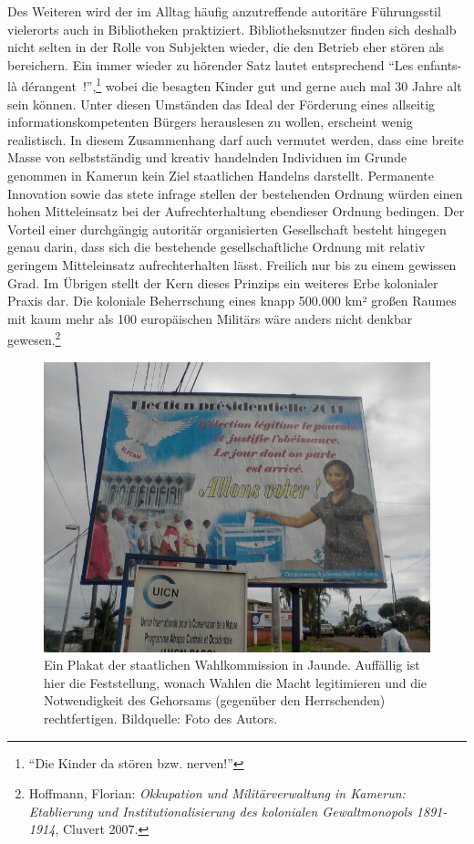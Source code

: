 \documentclass[a4paper,
fontsize=11pt,
oneside,
numbers=noperiodatend,
parskip=half-,
bibliography=totoc,
final
]{scrartcl}
\begin{document}
Des Weiteren wird der im Alltag häufig anzutreffende autoritäre
Führungsstil vielerorts auch in Bibliotheken praktiziert.
Bibliotheksnutzer finden sich deshalb nicht selten in der Rolle von
Subjekten wieder, die den Betrieb eher stören als bereichern. Ein immer
wieder zu hörender Satz lautet entsprechend \enquote{Les enfants-là
dérangent~!},\footnote{\enquote{Die Kinder da stören bzw. nerven!}}
wobei die besagten Kinder gut und gerne auch mal 30 Jahre alt sein
können. Unter diesen Umständen das Ideal der Förderung eines allseitig
informationskompetenten Bürgers herauslesen zu wollen, erscheint wenig
realistisch. In diesem Zusammenhang darf auch vermutet werden, dass eine
breite Masse von selbstständig und kreativ handelnden Individuen im
Grunde genommen in Kamerun kein Ziel staatlichen Handelns darstellt.
Permanente Innovation sowie das stete infrage stellen der bestehenden
Ordnung würden einen hohen Mitteleinsatz bei der Aufrechterhaltung
ebendieser Ordnung bedingen. Der Vorteil einer durchgängig autoritär
organisierten Gesellschaft besteht hingegen genau darin, dass sich die
bestehende gesellschaftliche Ordnung mit relativ geringem Mitteleinsatz
aufrechterhalten lässt. Freilich nur bis zu einem gewissen Grad. Im
Übrigen stellt der Kern dieses Prinzips ein weiteres Erbe kolonialer
Praxis dar. Die koloniale Beherrschung eines knapp 500.000 km² großen
Raumes mit kaum mehr als 100 europäischen Militärs wäre anders nicht
denkbar gewesen.\footnote{Hoffmann, Florian: \emph{Okkupation und
  Militärverwaltung in Kamerun: Etablierung und Institutionalisierung
  des kolonialen Gewaltmonopols 1891-1914}, Cluvert 2007.}

\begin{figure}[htbp]
\centering
\includegraphics{img/Wahlen.jpg}
\caption{Ein Plakat der staatlichen Wahlkommission in Jaunde. Auffällig
ist hier die Feststellung, wonach Wahlen die Macht legitimieren und die
Notwendigkeit des Gehorsams (gegenüber den Herrschenden) rechtfertigen.
Bildquelle: Foto des Autors.}
\end{figure}
\end{document}

